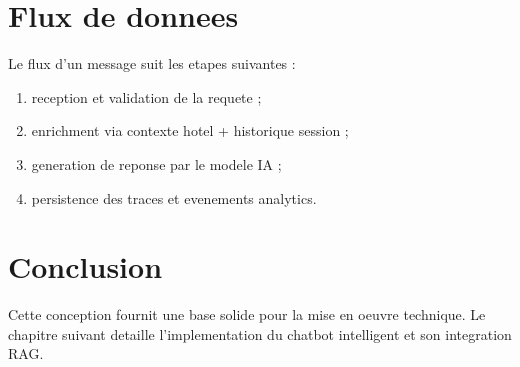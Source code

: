 \section{Flux de donnees}
Le flux d'un message suit les etapes suivantes :
\begin{enumerate}
  \item reception et validation de la requete ;
  \item enrichment via contexte hotel + historique session ;
  \item generation de reponse par le modele IA ;
  \item persistence des traces et evenements analytics.
\end{enumerate}

\section{Conclusion}
Cette conception fournit une base solide pour la mise en oeuvre technique. Le chapitre suivant detaille l'implementation du chatbot intelligent et son integration RAG.
